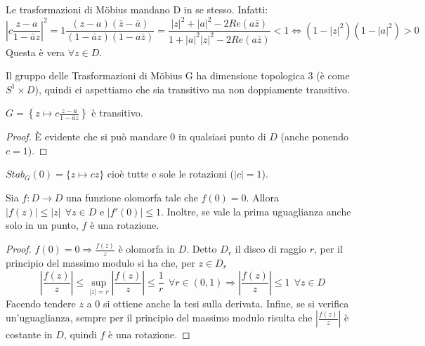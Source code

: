 \begin{osservazione}
Le trasformazioni di Möbius mandano D in se stesso. Infatti: 
$$\left|c \frac{z-a}{1- \bar{a}z} \right|^2 = 1 \frac{(z-a)(\bar{z}-\bar{a})}{(1- \bar{a}z)({1- a\bar{z}})}=
\frac{|z|^2 + |a|^2 - 2Re(a \bar{z})}{1+ |a|^2 |z|^2 - 2Re(a \bar{z})} <1
\Longleftrightarrow \left( 1-|z|^2 \right) \left( 1-|a|^2 \right) >0$$
Questa è vera $\forall z \in D$.
\end{osservazione}

\begin{osservazione}
Il gruppo delle Trasformazioni di Möbius G ha dimensione topologica 3 (è come $S^1 \times D$),
quindi ci aspettiamo che sia transitivo ma non doppiamente transitivo.
\end{osservazione}

\begin{lemma}
$G= \left \{ z \mapsto \displaystyle{c \frac{z-a}{1- \bar{a}z}} \right \}$ è transitivo.
\end{lemma}
\begin{proof}
È evidente che si può mandare $0$ in qualsiasi punto di $D$ (anche ponendo $c=1$).
\end{proof}

\begin{osservazione}
$Stab_G (0) = \{z \mapsto cz \}$ cioè tutte e sole le rotazioni ($|c| = 1$).
\end{osservazione}

\begin{lemma}[di Schwarz]
Sia $f:D\rightarrow D$ una funzione olomorfa tale che $f(0)=0$. 
Allora $|f(z)| \leq |z|\ \ \forall z \in D$ e $|f'(0)| \leq 1$. Inoltre, se vale la prima uguaglianza anche solo in un punto, $f$ è una rotazione.
\end{lemma}
\begin{proof}
$f(0)=0 \Rightarrow \frac{f(z)}{z}$ è olomorfa in $D$. Detto $D_r$ il disco di raggio $r$,
per il principio del massimo modulo si ha che, per $z \in D_r$
$$\left| \frac{f(z)}{z} \right| \leq \sup_{|z|=r} \left| \frac{f(z)}{z} \right| \leq \frac{1}{r} \ \  \forall r \in (0,1)
\Longrightarrow \left| \frac{f(z)}{z} \right| \leq 1 \ \ \forall z \in D$$
Facendo tendere $z$ a $0$ si ottiene anche la tesi sulla derivata.
Infine, se si verifica un'uguaglianza, sempre per il principio del massimo modulo risulta che
$\left| \frac{f(z)}{z} \right|$ è costante in $D$, quindi $f$ è una rotazione.
\end{proof}


